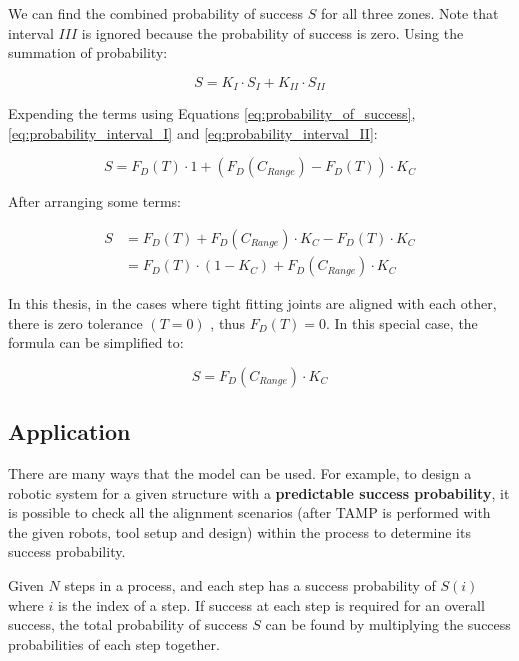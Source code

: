 

We can find the combined probability of success $S$ for all three zones. Note that interval $III$ is ignored because the probability of success is zero. Using the summation of probability:

\begin{equation} \label{eq:probability_of_three_intervals}
    S = K_I \cdot S_I + K_{II} \cdot S_{II}   
\end{equation}

Expending the terms using Equations \ref{eq:probability_of_success}, \ref{eq:probability_interval_I} and \ref{eq:probability_interval_II}:

\begin{equation} \label{eq:probability_expanded}
    S = F_D(T) \cdot 1 + (F_D (C_{Range}) - F_D(T)) \cdot K_C
\end{equation}

After arranging some terms:

\begin{align} \label{eq:probability_expanded_rearranged}
    S &= F_D(T) + F_D (C_{Range}) \cdot K_C - F_D(T) \cdot K_C \nonumber \\
      &= F_D(T) \cdot (1 - K_C) + F_D(C_{Range}) \cdot K_C 
\end{align}

In this thesis, in the cases where tight fitting joints are aligned with each other, there is zero tolerance $(T = 0)$ , thus $F_D(T) = 0$. In this special case, the formula can be simplified to:

\begin{equation} \label{eq:probability_when_zero_tolerance}
    S = F_D(C_{Range}) \cdot K_C 
\end{equation}

\subsection{Application}

There are many ways that the model can be used. For example, to design a robotic system for a given structure with a \textbf{predictable success probability}, it is possible to check all the alignment scenarios (after TAMP is performed with the given robots, tool setup and design) within the process to determine its success probability. 

Given $N$ steps in a process, and each step has a success probability of $S(i)$ where $i$ is the index of a step. If success at each step is required for an overall success, the total probability of success $S$ can be found by multiplying the success probabilities of each step together.

